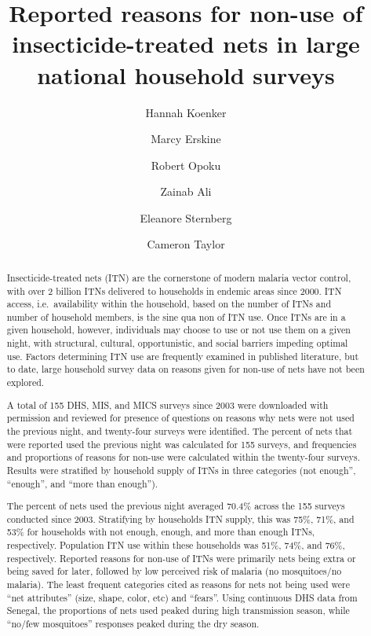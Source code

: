 \documentclass[review,
3p]{elsarticle} %
\begin{document}
\begin{frontmatter}

  \title{Reported reasons for non-use of insecticide-treated nets in
large national household surveys}
    \author[Tropical Health LLP]{Hannah Koenker}
    \author[International Federation of the Red Cross and Red Crescent
Societies]{Marcy Erskine}
    \author[International Federation of the Red Cross and Red Crescent
Societies]{Robert Opoku}
    \author[International Federation of the Red Cross and Red Crescent
Societies]{Zainab Ali}
    \author[Tropical Health LLP]{Eleanore Sternberg}
    \author[ICF]{Cameron Taylor}
  
  \begin{abstract}
  Insecticide-treated nets (ITN) are the cornerstone of modern malaria
  vector control, with over 2 billion ITNs delivered to households in
  endemic areas since 2000. ITN access, i.e.~availability within the
  household, based on the number of ITNs and number of household
  members, is the sine qua non of ITN use. Once ITNs are in a given
  household, however, individuals may choose to use or not use them on a
  given night, with structural, cultural, opportunistic, and social
  barriers impeding optimal use. Factors determining ITN use are
  frequently examined in published literature, but to date, large
  household survey data on reasons given for non-use of nets have not
  been explored.

  A total of 155 DHS, MIS, and MICS surveys since 2003 were downloaded
  with permission and reviewed for presence of questions on reasons why
  nets were not used the previous night, and twenty-four surveys were
  identified. The percent of nets that were reported used the previous
  night was calculated for 155 surveys, and frequencies and proportions
  of reasons for non-use were calculated within the twenty-four surveys.
  Results were stratified by household supply of ITNs in three
  categories (not enough'', ``enough'', and ``more than enough'').

  The percent of nets used the previous night averaged 70.4\% across the
  155 surveys conducted since 2003. Stratifying by households ITN
  supply, this was 75\%, 71\%, and 53\% for households with not enough,
  enough, and more than enough ITNs, respectively. Population ITN use
  within these households was 51\%, 74\%, and 76\%, respectively.
  Reported reasons for non-use of ITNs were primarily nets being extra
  or being saved for later, followed by low perceived risk of malaria
  (no mosquitoes/no malaria). The least frequent categories cited as
  reasons for nets not being used were ``net attributes'' (size, shape,
  color, etc) and ``fears''. Using continuous DHS data from Senegal, the
  proportions of nets used peaked during high transmission season, while
  ``no/few mosquitoes'' responses peaked during the dry season.


\end{abstract}
\end{frontmatter}
\end{document}

